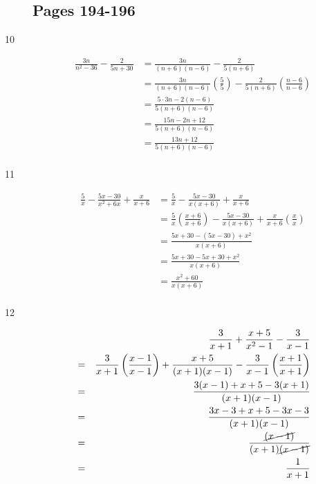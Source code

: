 \documentclass[fleqn,addpoints]{exam}
\begin{document}
\begin{description}

\subsection{Pages 194-196}

\item[10] 
\begin{align*}
  \frac{3n}{n^2-36} - \frac{2}{5n + 30} &= \frac{3n}{(n+6)(n-6)} - \frac{2}{5(n+6)} \\
  &= \frac{3n}{(n+6)(n-6)} \left( \frac{5}{5} \right) - \frac{2}{5(n+6)} \left( \frac{n-6}{n-6} \right) \\
  &= \frac{5 \cdot 3n - 2(n-6)}{5(n+6)(n-6)} \\
  &= \frac{15n - 2n + 12}{5(n+6)(n-6)} \\
  &= \frac{13n + 12}{5(n+6)(n-6)} \\
\end{align*}

\item[11]
\begin{align*}
  \frac{5}{x} - \frac{5x-30}{x^2+6x} + \frac{x}{x+6} &= \frac{5}{x} - \frac{5x-30}{x(x+6)} + \frac{x}{x+6} \\
  &= \frac{5}{x} \left( \frac{x+6}{x+6} \right) - \frac{5x-30}{x(x+6)} + \frac{x}{x+6} \left( \frac{x}{x} \right) \\
  &= \frac{5x+30 - (5x - 30) + x^2}{x(x+6)} \\
  &= \frac{5x + 30 - 5x + 30 + x^2}{x(x+6)} \\
  &= \frac{x^2 + 60}{x(x+6)} \\
\end{align*}


\item[12]
\begin{eqnarray*}
  && \frac{3}{x+1} + \frac{x+5}{x^2-1} - \frac{3}{x-1} \\
  &=& \frac{3}{x+1} \left( \frac{x-1}{x-1} \right) + \frac{x+5}{(x+1)(x-1)} - \frac{3}{x-1} \left( \frac{x+1}{x+1} \right) \\
  &=& \frac{3(x-1) + x + 5 - 3(x + 1)}{(x+1)(x-1)} \\
  &=& \frac{3x - 3 + x + 5 - 3x - 3}{(x+1)(x-1)} \\
  &=& \frac{\cancel{(x-1)}}{(x+1)\cancel{(x-1)}} \\
  &=& \frac{1}{x+1} \\
\end{eqnarray*}


\end{description}
\end{document}
